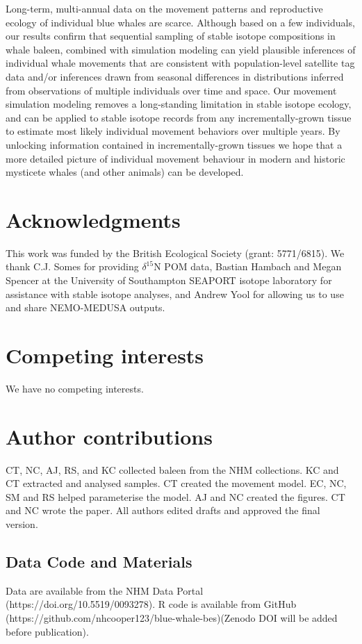 \documentclass[a4paper,12pt]{article}
\begin{document}
Long-term, multi-annual data on the movement patterns and reproductive ecology of individual blue whales are scarce. 
Although based on a few individuals, our results confirm that sequential sampling of stable isotope compositions in whale baleen, combined with simulation modeling can yield plausible inferences of individual whale movements that are consistent with population-level satellite tag data and/or inferences drawn from seasonal differences in distributions inferred from observations of multiple individuals over time and space. 
Our movement simulation modeling removes a long-standing limitation in stable isotope ecology, and can be applied to stable isotope records from any incrementally-grown tissue to estimate most likely individual movement behaviors over multiple years. 
By unlocking information contained in incrementally-grown tissues we hope that a more detailed picture of individual movement behaviour in modern and historic mysticete whales (and other animals) can be developed.



%


\section{Acknowledgments}\label{acknowledgments}
This work was funded by the British Ecological Society (grant: 5771/6815). 
We thank C.J. Somes for providing  $\delta^{15}$N POM data, Bastian Hambach and Megan Spencer at the University of Southampton SEAPORT isotope laboratory for assistance with stable isotope analyses, and Andrew Yool for allowing us to use and share NEMO-MEDUSA outputs.

\section{Competing interests}
We have no competing interests.

\section{Author contributions}\label{author-contributions}
CT, NC, AJ, RS, and KC collected baleen from the NHM collections. 
KC and CT extracted and analysed samples.
CT created the movement model.
EC, NC, SM and RS helped parameterise the model.
AJ and NC created the figures. 
CT and NC wrote the paper.
All authors edited drafts and approved the final version.

\subsection{Data Code and Materials}\label{data-code-and-materials}
Data are available from the NHM Data Portal (https://doi.org/10.5519/0093278). 
R code is available from GitHub (https://github.com/nhcooper123/blue-whale-bes)(Zenodo DOI will be added before publication).
\end{document}
